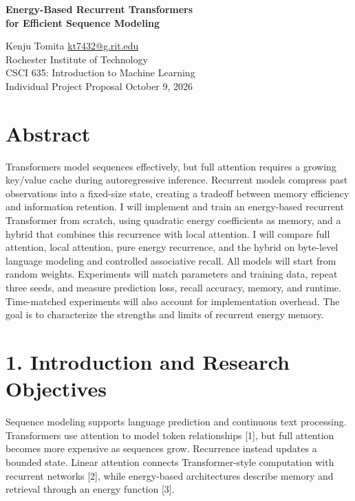 \documentclass[11pt,letterpaper]{article}
\begin{document}
\begin{center}
{\Large\bfseries Energy-Based Recurrent Transformers\\for Efficient Sequence Modeling}\par
\vspace{3pt}
Kenju Tomita \quad \href{mailto:kt7432@g.rit.edu}{kt7432@g.rit.edu}\\
Rochester Institute of Technology\\
CSCI 635: Introduction to Machine Learning\\
Individual Project Proposal \quad October 9, 2026
\end{center}

\section*{Abstract}

Transformers model sequences effectively, but full attention requires a growing key/value cache during autoregressive inference. Recurrent models compress past observations into a fixed-size state, creating a tradeoff between memory efficiency and information retention. I will implement and train an energy-based recurrent Transformer from scratch, using quadratic energy coefficients as memory, and a hybrid that combines this recurrence with local attention. I will compare full attention, local attention, pure energy recurrence, and the hybrid on byte-level language modeling and controlled associative recall. All models will start from random weights. Experiments will match parameters and training data, repeat three seeds, and measure prediction loss, recall accuracy, memory, and runtime. Time-matched experiments will also account for implementation overhead. The goal is to characterize the strengths and limits of recurrent energy memory.

\section*{1. Introduction and Research Objectives}

Sequence modeling supports language prediction and continuous text processing. Transformers use attention to model token relationships [1], but full attention becomes more expensive as sequences grow. Recurrence instead updates a bounded state. Linear attention connects Transformer-style computation with recurrent networks [2], while energy-based architectures describe memory and retrieval through an energy function [3].
\end{document}
